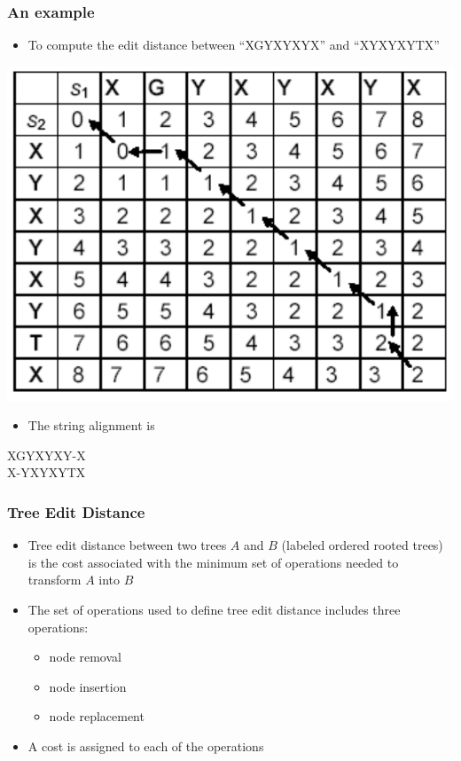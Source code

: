 \documentclass[svgnames]{beamer}
\begin{document}
\begin{frame} \frametitle{An example}
  
  \begin{itemize}
  \item To compute the edit distance between ``XGYXYXYX'' and ``XYXYXYTX''
  \end{itemize}

  \begin{center}
    \includegraphics[width=.5\linewidth]{dynamic}
  \end{center}

  \begin{itemize}
  \item The string alignment is
  \end{itemize}

  \begin{center}
    \ttfamily
    XGYXYXY-X \\
    X-YXYXYTX
  \end{center}


\end{frame}


\begin{frame} \frametitle{Tree Edit Distance}
  
  \begin{itemize}
  \item Tree edit distance between two trees $A$ and $B$ (labeled ordered
    rooted trees) is the cost associated with the minimum set of operations
    needed to transform $A$ into $B$
  \item The set of operations used to define tree edit distance includes three
    operations:
    \begin{itemize}
    \item node removal
    \item node insertion
    \item node replacement
    \end{itemize}
  \item A cost is assigned to each of the operations
  \end{itemize}

\end{frame}
\end{document}
